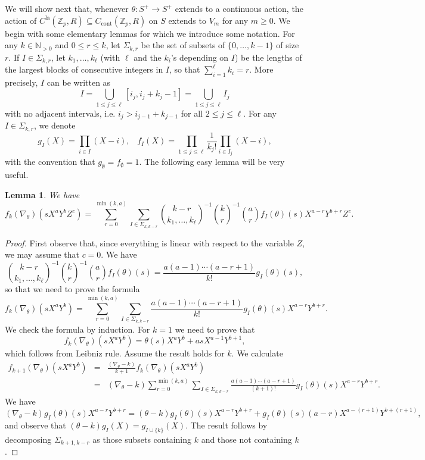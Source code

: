 \documentclass[10pt, oneside]{amsart}
\numberwithin{equation}{subsection}
\newtheorem{lemma}[equation]{Lemma}
\theoremstyle{definition}
\theoremstyle{remark}
\newcommand{\opn}[1]{\operatorname{#1}}
\def\Z{{\mathbb{Z}}}
\def\N{{\mathbb{N}}}
\def\zp{{\Z_p}}
\begin{document}
We will show next that, whenever $\theta : S^+ \to S^+$ extends to a continuous action, the action of $C^{\opn{la}}(\zp, R) \subseteq C_{\opn{cont}}(\zp, R)$ on $S$ extends to $V_m$ for any $m \geq 0$. We begin with some elementary lemmas for which we introduce some notation. For any $k \in \N_{>0}$ and $0 \leq r \leq k$, let $\Sigma_{k, r}$ be the set of subsets of $\{0, \ldots, k-1\}$ of size $r$. If $I \in \Sigma_{k, r}$, let $k_1, \ldots, k_\ell$ (with $\ell$ and the $k_i$'s depending on $I$) be the lengths of the largest blocks of consecutive integers in $I$, so that $\sum_{i=1}^\ell k_i = r$. More precisely, $I$ can be written as
\[ 
I = \bigcup_{1 \leq j \leq \ell} [i_j, i_j + k_j - 1] = \bigcup_{1 \leq j \leq \ell} I_j
\]
with no adjacent intervals, i.e. $i_j > i_{j-1} + k_{j-1}$ for all $2 \leq j \leq \ell$. For any $I \in \Sigma_{k, r}$, we denote
\[ 
g_I(X) = \prod_{i \in I} (X - i), \;\;\; f_I(X) = \prod_{1 \leq j \leq \ell} \frac{1}{k_j!} \prod_{i \in I_j} (X - i),
\]
with the convention that $g_{\emptyset} = f_{\emptyset} = 1$. The following easy lemma will be very useful.

\begin{lemma} \label{Lemmaformulatheta}
We have
\[ f_k(\nabla_\theta)(s X^a Y^b Z^c) = \sum_{r = 0}^{\min(k, a)} \sum_{I \in \Sigma_{k, k-r}} \binom{k - r}{k_1, \ldots, k_\ell}^{-1} \binom{k}{r}^{-1} \binom{a}{r}  f_I(\theta)(s) X^{a-r} Y^{b+r} Z^c. \]
\end{lemma}

\begin{proof}
First observe that, since everything is linear with respect to the variable $Z$, we may assume that $c = 0$. We have 
\[ \binom{k - r}{k_1, \ldots, k_\ell}^{-1} \binom{k}{r}^{-1} \binom{a}{r}  f_I(\theta)(s) = \frac{a (a - 1) \cdots (a - r + 1)}{k!} g_I(\theta)(s), \]
so that we need to prove the formula
\[f_k(\nabla_\theta)(s X^a Y^b) =  \sum_{r = 0}^{\min(k, a)} \sum_{I \in \Sigma_{k, k-r}} \frac{a (a - 1) \cdots (a - r + 1)}{k!} g_I(\theta)(s) X^{a-r} Y^{b+r}. \]
We check the formula by induction. For $k=1$ we need to prove that
\[ f_k(\nabla_\theta)(s X^a Y^b) = \theta(s) X^a Y^b + a s X^{a-1} Y^{b + 1}, \]
which follows from Leibniz rule. Assume the result holds for $k$. We calculate
\begin{eqnarray*}
f_{k+1}(\nabla_\theta)(s X^a Y^b) &=& \frac{(\nabla_\theta - k)}{k+1} f_k(\nabla_\theta)(s X^a Y^b) \\
&=& (\nabla_\theta - k) \sum_{r = 0}^{\min(k, a)} \sum_{I \in \Sigma_{k, k-r}} \frac{a (a - 1) \cdots (a - r + 1)}{(k+1)!} g_I(\theta)(s) X^{a-r} Y^{b+r}.
\end{eqnarray*}
We have
\[ (\nabla_\theta - k) g_I(\theta)(s) X^{a - r} Y^{b + r} = (\theta - k) g_I(\theta)(s) X^{a - r} Y^{b + r} + g_I(\theta)(s) (a - r) X^{a - (r + 1)} Y^{b + (r + 1)}, \]
and observe that $(\theta - k) g_I(X) = g_{I \cup \{ k \}}(X)$. The result follows by decomposing $\Sigma_{k+1, k-r}$ as those subsets containing $k$ and those not containing $k$.
\end{proof}
\end{document}
